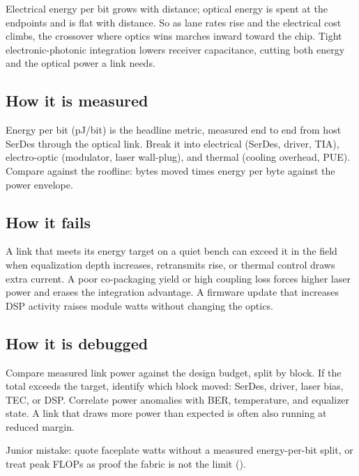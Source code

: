 Electrical energy per bit grows with distance; optical energy is spent at the
endpoints and is flat with distance. So as lane rates rise and the electrical cost
climbs, the crossover where optics wins marches inward toward the chip. Tight
electronic-photonic integration lowers receiver capacitance, cutting both energy
and the optical power a link needs.

\subsection{How it is measured}

Energy per bit (pJ/bit) is the headline metric, measured end to end from host
SerDes through the optical link. Break it into electrical (SerDes, driver, TIA),
electro-optic (modulator, laser wall-plug), and thermal (cooling overhead, PUE).
Compare against the roofline: bytes moved times energy per byte against the power
envelope.

\subsection{How it fails}

A link that meets its energy target on a quiet bench can exceed it in the field
when equalization depth increases, retransmits rise, or thermal control draws
extra current. A poor co-packaging yield or high coupling loss forces higher laser
power and erases the integration advantage. A firmware update that increases DSP
activity raises module watts without changing the optics.

\subsection{How it is debugged}

Compare measured link power against the design budget, split by block. If the
total exceeds the target, identify which block moved: SerDes, driver, laser bias,
TEC, or DSP. Correlate power anomalies with BER, temperature, and equalizer state.
A link that draws more power than expected is often also running at reduced margin.


Junior mistake: quote faceplate watts without a measured energy-per-bit split, or
treat peak FLOPs as proof the fabric is not the limit
().

